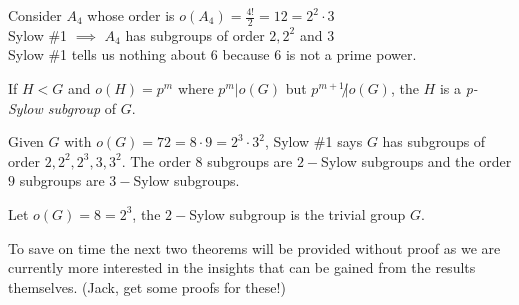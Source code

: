 \begin{example}
Consider $A_4$ whose order is $o(A_4)= \frac{4!}{2} = 12 =2^2\cdot 3$ \\ 
\noindent Sylow \#1 $\implies$ $A_4$ has subgroups of order $2,2^2$ and $3$ \steezybreak\\
\noindent Sylow \#1 tells us nothing about $6$ because $6$ is not a prime power.
\end{example}

\begin{definition}
If $H<G$ and $o(H)=p^m$ where $p^m|o(G)$ but $p^{m+1}\not | o(G)$, the $H$ is a \textit{p-Sylow subgroup} of $G$.
\end{definition}

\begin{example}
Given $G$ with $o(G)=72=8\cdot 9=2^3\cdot 3^2$, Sylow \#1 says $G$ has subgroups of order $2,2^2,2^3,3,3^2$. The order $8$ subgroups are $2-$Sylow subgroups and the order $9$ subgroups are $3-$Sylow subgroups.
\end{example}
\begin{example}
Let $o(G)=8=2^3$, the $2-$Sylow subgroup is the trivial group $G$.
\end{example}

To save on time the next two theorems will be provided without proof as we are currently more interested in the insights that can be gained from the results themselves. (Jack, get some proofs for these!)

